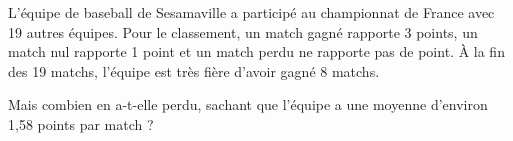 
L’équipe de baseball de Sesamaville a participé au championnat de France avec 19 autres équipes. Pour le classement, un match gagné rapporte 3 points, un match nul rapporte 1 point et un match perdu ne rapporte pas de point. À la fin des 19 matchs, l’équipe est très fière d’avoir gagné 8 matchs.

Mais combien en a-t-elle perdu, sachant que l’équipe a
une moyenne d’environ 1,58 points par match ?